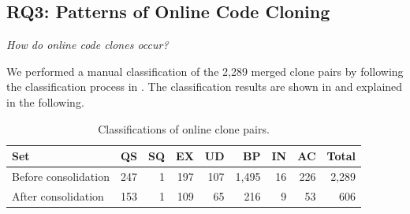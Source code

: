 \documentclass[10pt,journal,compsoc]{IEEEtran}
\begin{document}
\subsection{RQ3: Patterns of Online Code Cloning}
\vspace{0.25cm}
\textit{How do online code clones occur?}
\vspace{0.25cm}

We performed a manual classification
of the 2,289 merged clone pairs by following the classification process
in . 
The classification results are shown in  
and explained in the following.

\begin{table}
	\centering
	\caption{Classifications of online clone pairs.}
	\label{tab:classification_good_o}
	\begin{tabular}{lrrrrrrrr}
		\toprule
		Set & QS & SQ & EX & UD & BP & IN & AC & Total \\ 
		\midrule
		Before consolidation & 247 & 1 & 197 & 107 & 1,495 & 16 & 226 & 2,289 \\
		After consolidation & 153 & 1 & 109 & 65 & 216 & 9 & 53 & 606 \\
		\bottomrule
	\end{tabular} 
\end{table}

\end{document}
